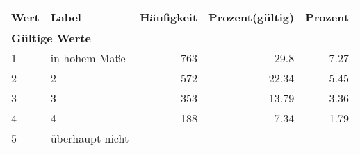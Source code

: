      \begin{longtable}{lXrrr}
     \toprule
     \textbf{Wert} & \textbf{Label} & \textbf{Häufigkeit} & \textbf{Prozent(gültig)} & \textbf{Prozent} \\
     \endhead
     \midrule
     \multicolumn{5}{l}{\textbf{Gültige Werte}}\\

     1 &
     \multicolumn{1}{X}{ in hohem Maße   } &


       \num{763} &
       \num[round-mode=places,round-precision=2]{29.8} &
         \num[round-mode=places,round-precision=2]{7.27} \\

     2 &
     \multicolumn{1}{X}{ 2   } &


       \num{572} &
       \num[round-mode=places,round-precision=2]{22.34} &
         \num[round-mode=places,round-precision=2]{5.45} \\

     3 &
     \multicolumn{1}{X}{ 3   } &


       \num{353} &
       \num[round-mode=places,round-precision=2]{13.79} &
         \num[round-mode=places,round-precision=2]{3.36} \\

     4 &
     \multicolumn{1}{X}{ 4   } &


       \num{188} &
       \num[round-mode=places,round-precision=2]{7.34} &
         \num[round-mode=places,round-precision=2]{1.79} \\

     5 &
     \multicolumn{1}{X}{ überhaupt nicht   } &



\end{longtable}
